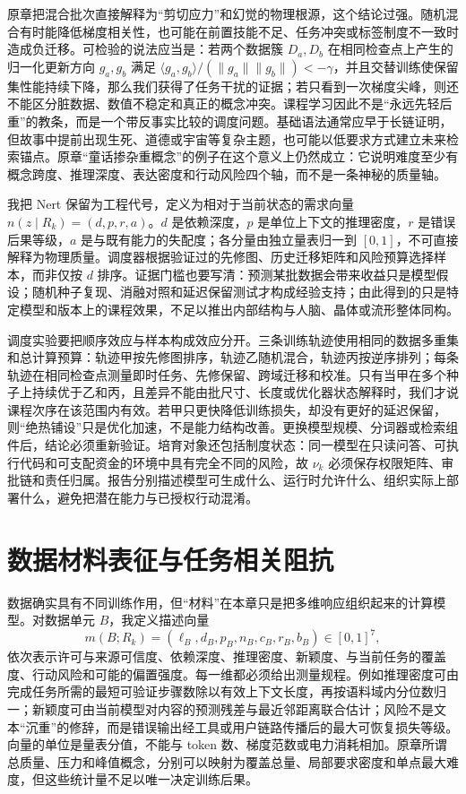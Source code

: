 原章把混合批次直接解释为“剪切应力”和幻觉的物理根源，这个结论过强。随机混合有时能降低梯度相关性，也可能在前置技能不足、任务冲突或标签制度不一致时造成负迁移。可检验的说法应当是：若两个数据簇 $D_a,D_b$ 在相同检查点上产生的归一化更新方向 $g_a,g_b$ 满足 $\langle g_a,g_b\rangle/(\|g_a\|\|g_b\|)<-\gamma$，并且交替训练使保留集性能持续下降，那么我们获得了任务干扰的证据；若只看到一次梯度尖峰，则还不能区分脏数据、数值不稳定和真正的概念冲突。课程学习因此不是“永远先轻后重”的教条，而是一个带反事实比较的调度问题。基础语法通常应早于长链证明，但故事中提前出现生死、道德或宇宙等复杂主题，也可能以低要求方式建立未来检索锚点。原章“童话掺杂重概念”的例子在这个意义上仍然成立：它说明难度至少有概念跨度、推理深度、表达密度和行动风险四个轴，而不是一条神秘的质量轴。

我把 Nert 保留为工程代号，定义为相对于当前状态的需求向量 $n(z\mid R_k)=(d,p,r,a)$。$d$ 是依赖深度，$p$ 是单位上下文的推理密度，$r$ 是错误后果等级，$a$ 是与既有能力的失配度；各分量由独立量表归一到 $[0,1]$，不可直接解释为物理质量。调度器根据验证过的先修图、历史迁移矩阵和风险预算选择样本，而非仅按 $d$ 排序。证据门槛也要写清：预测某批数据会带来收益只是模型假设；随机种子复现、消融对照和延迟保留测试才构成经验支持；由此得到的只是特定模型和版本上的课程效果，不足以推出内部结构与人脑、晶体或流形整体同构。

调度实验要把顺序效应与样本构成效应分开。三条训练轨迹使用相同的数据多重集和总计算预算：轨迹甲按先修图排序，轨迹乙随机混合，轨迹丙按逆序排列；每条轨迹在相同检查点测量即时任务、先修保留、跨域迁移和校准。只有当甲在多个种子上持续优于乙和丙，且差异不能由批尺寸、长度或优化器状态解释时，我们才说课程次序在该范围内有效。若甲只更快降低训练损失，却没有更好的延迟保留，则“绝热铺设”只是优化加速，不是能力结构改善。更换模型规模、分词器或检索组件后，结论必须重新验证。培育对象还包括制度状态：同一模型在只读问答、可执行代码和可支配资金的环境中具有完全不同的风险，故 $\nu_k$ 必须保存权限矩阵、审批链和责任归属。报告分别描述模型可生成什么、运行时允许什么、组织实际上部署什么，避免把潜在能力与已授权行动混淆。

\section{数据材料表征与任务相关阻抗}
\label{sec:cognitive_materials_science_nert_density}

数据确实具有不同训练作用，但“材料”在本章只是把多维响应组织起来的计算模型。对数据单元 $B$，我定义描述向量
\begin{equation}
m(B;R_k)=(\ell_B,d_B,p_B,n_B,c_B,r_B,b_B)\in[0,1]^7,
\end{equation}
依次表示许可与来源可信度、依赖深度、推理密度、新颖度、与当前任务的覆盖度、行动风险和可能的偏置强度。每一维都必须给出测量规程。例如推理密度可由完成任务所需的最短可验证步骤数除以有效上下文长度，再按语料域内分位数归一；新颖度可由当前模型对内容的预测残差与最近邻距离联合估计；风险不是文本“沉重”的修辞，而是错误输出经工具或用户链路传播后的最大可恢复损失等级。向量的单位是量表分值，不能与 token 数、梯度范数或电力消耗相加。原章所谓总质量、压力和峰值概念，分别可以映射为覆盖总量、局部要求密度和单点最大难度，但这些统计量不足以唯一决定训练后果。

